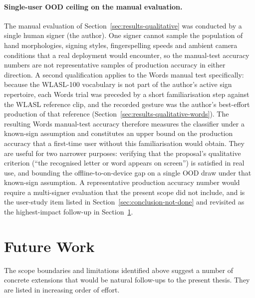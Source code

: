 \paragraph{Single-user OOD ceiling on the manual evaluation.}
The manual evaluation of Section~\ref{sec:results-qualitative} was
conducted by a single human signer (the author). One signer cannot
sample the population of hand morphologies, signing styles,
fingerspelling speeds and ambient camera conditions that a real
deployment would encounter, so the manual-test accuracy numbers are
not representative samples of production accuracy in either
direction. A second qualification applies to the Words manual test
specifically: because the WLASL-100 vocabulary is not part of the
author's active sign repertoire, each Words trial was preceded by a
short familiarisation step against the WLASL reference clip, and
the recorded gesture was the author's best-effort production of
that reference (Section~\ref{sec:results-qualitative-words}). The
resulting Words manual-test accuracy therefore measures the
classifier under a known-sign assumption and constitutes an upper
bound on the production accuracy that a first-time user without
this familiarisation would obtain. They are useful for two narrower
purposes: verifying that the proposal's qualitative criterion
(``the recognised letter or word appears on screen'') is satisfied
in real use, and bounding the offline-to-on-device gap on a single
OOD draw under that known-sign assumption. A
representative production accuracy number would require a
multi-signer evaluation that the present scope did not include,
and is the user-study item listed in
Section~\ref{sec:conclusion-not-done} and revisited as the highest-impact
follow-up in Section~\ref{sec:conclusion-future}.

\section{Future Work}
\label{sec:conclusion-future}

The scope boundaries and limitations identified above suggest a
number of concrete extensions that would be natural follow-ups to
the present thesis. They are listed in increasing order of effort.

